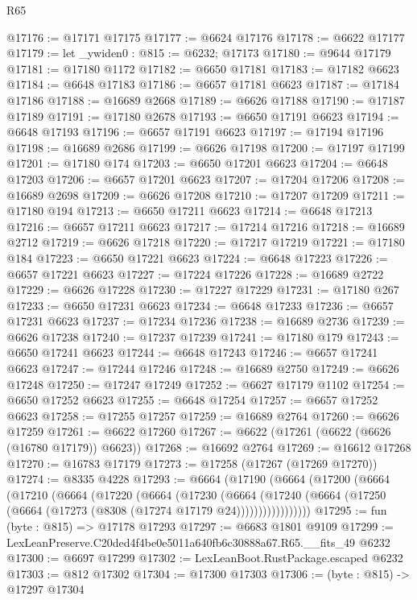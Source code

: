 \begin{lexlean}{R65}
\begin{coremodule}
{@17176 := @17171 @17175
@17177 := @6624 @17176
@17178 := @6622 @17177
@17179 := let _ywiden0 : @815 := @6232; @17173
@17180 := @9644 @17179
@17181 := @17180 @1172
@17182 := @6650 @17181
@17183 := @17182 @6623
@17184 := @6648 @17183
@17186 := @6657 @17181 @6623
@17187 := @17184 @17186
@17188 := @16689 @2668
@17189 := @6626 @17188
@17190 := @17187 @17189
@17191 := @17180 @2678
@17193 := @6650 @17191 @6623
@17194 := @6648 @17193
@17196 := @6657 @17191 @6623
@17197 := @17194 @17196
@17198 := @16689 @2686
@17199 := @6626 @17198
@17200 := @17197 @17199
@17201 := @17180 @174
@17203 := @6650 @17201 @6623
@17204 := @6648 @17203
@17206 := @6657 @17201 @6623
@17207 := @17204 @17206
@17208 := @16689 @2698
@17209 := @6626 @17208
@17210 := @17207 @17209
@17211 := @17180 @194
@17213 := @6650 @17211 @6623
@17214 := @6648 @17213
@17216 := @6657 @17211 @6623
@17217 := @17214 @17216
@17218 := @16689 @2712
@17219 := @6626 @17218
@17220 := @17217 @17219
@17221 := @17180 @184
@17223 := @6650 @17221 @6623
@17224 := @6648 @17223
@17226 := @6657 @17221 @6623
@17227 := @17224 @17226
@17228 := @16689 @2722
@17229 := @6626 @17228
@17230 := @17227 @17229
@17231 := @17180 @267
@17233 := @6650 @17231 @6623
@17234 := @6648 @17233
@17236 := @6657 @17231 @6623
@17237 := @17234 @17236
@17238 := @16689 @2736
@17239 := @6626 @17238
@17240 := @17237 @17239
@17241 := @17180 @179
@17243 := @6650 @17241 @6623
@17244 := @6648 @17243
@17246 := @6657 @17241 @6623
@17247 := @17244 @17246
@17248 := @16689 @2750
@17249 := @6626 @17248
@17250 := @17247 @17249
@17252 := @6627 @17179 @1102
@17254 := @6650 @17252 @6623
@17255 := @6648 @17254
@17257 := @6657 @17252 @6623
@17258 := @17255 @17257
@17259 := @16689 @2764
@17260 := @6626 @17259
@17261 := @6622 @17260
@17267 := @6622 (@17261 (@6622 (@6626 (@16780 @17179)) @6623))
@17268 := @16692 @2764
@17269 := @16612 @17268
@17270 := @16783 @17179
@17273 := @17258 (@17267 (@17269 @17270))
@17274 := @8335 @4228
@17293 := @6664
    (@17190
      (@6664
        (@17200
          (@6664
            (@17210
              (@6664
                (@17220
                  (@6664
                    (@17230
                      (@6664
                        (@17240
                          (@6664 (@17250 (@6664 (@17273 (@8308 (@17274 @17179 @24)))))))))))))))))
@17295 := fun (byte : @815) => @17178 @17293
@17297 := @6683 @1801 @9109
@17299 := LexLeanPreserve.C20ded4f4be0e5011a640fb6c30888a67.R65.__fits_49 @6232
@17300 := @6697 @17299
@17302 := LexLeanBoot.RustPackage.escaped @6232
@17303 := @812 @17302
@17304 := @17300 @17303
@17306 := (byte : @815) -> @17297 @17304
}
\end{coremodule}
\end{lexlean}
